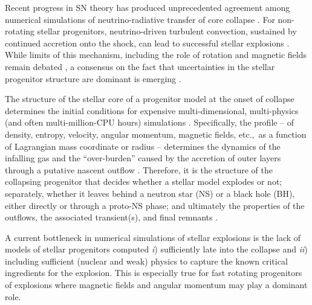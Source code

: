 \documentclass[%
trackchanges,twocolumn]{aastex701}
\begin{document}
Recent progress in SN theory has produced unprecedented agreement
among numerical simulations of neutrino-radiative transfer of core
collapse \citep[e.g.,][]{janka:12, melson:15, burrows:25, nakamura:25,
  mezzacappa:26, chen:26}. For non-rotating stellar progenitors,
neutrino-driven turbulent convection, sustained by continued accretion
onto the shock, can lead to successful stellar explosions
\citep[e.g.,][]{kuroda:18, ott:18, burrows:25}. While limits of this
mechanism, including the role of rotation and magnetic fields remain
debated \cite[e.g.,][]{soker:24, gottlieb:25}, a consensus on the fact
that uncertainties in the stellar progenitor structure are dominant is
emerging \citep[e.g.,][]{woosley:02, chieffi:13, sukhbold:16,
  farmer:16, renzo:17, mueller:17, limongi:18, davis:19, limongi:20, laplace:21,
  woosley:21, fields:22, bruenn:23, schneider:24, limongi:24, boccioli:24,
  renzo:24, limongi:25, burrows:25, maltsev:25, griffiths:26, myers:26}.

The structure of the stellar core of a progenitor model at the onset
of collapse determines the initial conditions for expensive
multi-dimensional, multi-physics (and often multi-million-CPU
hours) simulations \citep[e.g.,][]{janka:12, mueller:16rev,
  takiwaki:16, vartanyan:21, gottlieb:25}. Specifically, the profile
-- of density, entropy, velocity, angular momentum, magnetic fields,
etc.,~as a function of Lagrangian mass coordinate or radius --
determines the dynamics of the infalling gas and the ``over-burden''
caused by the accretion of outer layers through a putative
nascent outflow \citep[e.g.,][]{bruenn:13, bruenn:16}. Therefore, it
is the structure of the collapsing progenitor that decides whether
a stellar model explodes or not; separately, whether it leaves behind
a neutron star (NS) or a black hole (BH), either directly or through a
proto-NS phase; and ultimately the properties of the outflows,
the associated transient(s), and final remnants
\citep[e.g.,][]{kuroda:18, ott:18, vartanyan:19, burrows:24,
  nakamura:25, burrows:25}.

A current bottleneck in numerical simulations of stellar explosions
is the lack of models of stellar progenitors computed
\emph{i}) sufficiently late into the collapse and \emph{ii}) including
sufficient (nuclear and weak) physics to capture the known critical
ingredients for the explosion. This is especially true for fast
rotating progenitors of explosions where magnetic fields and angular
momentum may play a dominant role.
\end{document}
